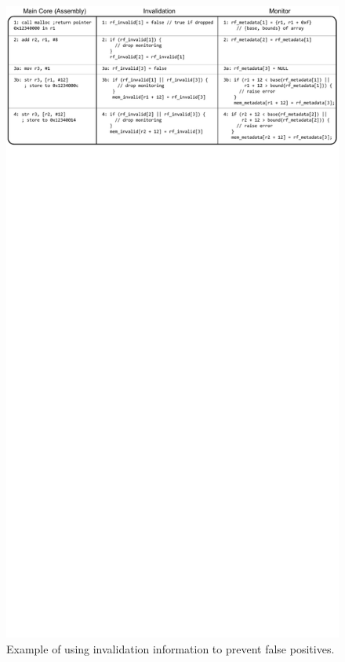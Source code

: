 \begin{figure}
  \begin{center}
    \includegraphics{monitoring_dift_drop/figs/example_invalid.pdf}
    \caption{Example of using invalidation information to prevent false positives.}
    \label{fig:monitoring_dift_drop.dropping.example_invalid}
  \end{center}
\end{figure}


